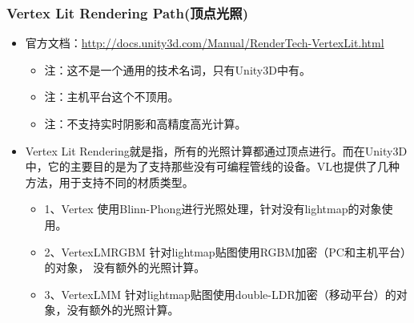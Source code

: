 \documentclass[9pt, b5paper]{article}
\begin{document}
\subsubsection{Vertex Lit Rendering Path(顶点光照)}
\label{sec:org0eba7a1}
\begin{itemize}
\item 官方文档：\url{http://docs.unity3d.com/Manual/RenderTech-VertexLit.html}
\begin{itemize}
\item 注：这不是一个通用的技术名词，只有Unity3D中有。
\item 注：主机平台这个不顶用。
\item 注：不支持实时阴影和高精度高光计算。
\end{itemize}
\item Vertex Lit Rendering就是指，所有的光照计算都通过顶点进行。而在Unity3D中，它的主要目的是为了支持那些没有可编程管线的设备。VL也提供了几种方法，用于支持不同的材质类型。
\begin{itemize}
\item 1、Vertex 使用Blinn-Phong进行光照处理，针对没有lightmap的对象使用。
\item 2、VertexLMRGBM 针对lightmap贴图使用RGBM加密（PC和主机平台）的对象， 没有额外的光照计算。
\item 3、VertexLMM 针对lightmap贴图使用double-LDR加密（移动平台）的对象，没有额外的光照计算。
\end{itemize}
\end{itemize}
\end{document}
